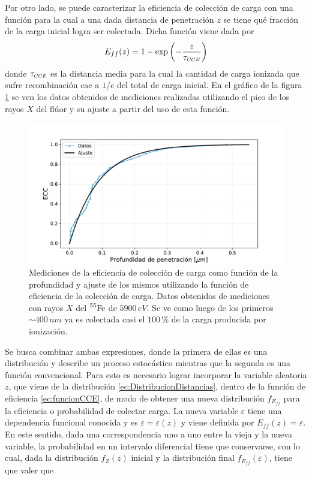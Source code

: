 Por otro lado, se puede caracterizar la eficiencia de colección de carga con una función para la cual a una dada distancia de penetración $z$ se tiene qué fracción de la carga inicial logra ser colectada. Dicha función viene dada por
\begin{equation}
    E_{ff}(z) = 1 - 
    \exp
    \left(
        -\frac{z}{\tau_{\scaleto{CCE}{4pt}}}
    \right)
        \label{ec:funcionCCE}
\end{equation}
donde $\tau_{\scaleto{CCE}{4pt}}$ es la distancia media para la cual la cantidad de carga ionizada que sufre recombinación cae a $1/e$ del total de carga inicial. En el gráfico de la figura \ref{fig:EficienciaCC} se ven los datos obtenidos de mediciones realizadas utilizando el pico de los rayos $X$ del flúor y su ajuste a partir del uso de esta función.
\begin{figure}[h]
    \centering
        \includegraphics[scale=0.5]{Figs/CCE_vs_z.pdf}
    \caption{\footnotesize{Mediciones de la eficiencia de colección de carga como función de la profundidad y ajuste de los mismos utilizando la función de eficiencia de la colección de carga. Datos obtenidos de mediciones con rayos $X$ del $\prescript{55}{}{\mbox{Fe}}$ de $5900\,\si{eV}$. Se ve como luego de los primeros $\sim 400\,\si{nm}$ ya es colectada casi el $100\,\%$ de la carga producida por ionización.}}
    \label{fig:EficienciaCC}
\end{figure}
Se busca combinar ambas expresiones, donde la primera de ellas es una distribución y describe un proceso estocástico mientras que la segunda es una función convencional. Para esto es necesario lograr incorporar la variable aleatoria $z$, que viene de la distribución \ref{ec:DistribucionDistancias}, dentro de la función de eficiencia \ref{ec:funcionCCE}, de modo de obtener una nueva distribución $f_{E_{ff}}$ para la eficiencia o probabilidad de colectar carga. La nueva variable $\varepsilon$ tiene una dependencia funcional conocida y es $\varepsilon = \varepsilon(z)$ y viene definida por $E_{ff}(z) = \varepsilon$. En este sentido, dada una correspondencia uno a uno entre la vieja y la nueva variable, la probabilidad en un intervalo diferencial tiene que conservarse, con lo cual, dada la distribución $f_{Z}(z)$ inicial y la distribución final $f_{E_{ff}}(\varepsilon)$, tiene que valer que
